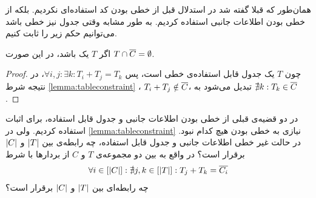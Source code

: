 همان‌طور که قبلا گفته شد در استدلال قبل از خطی بودن کد استفاده‌ای نکردیم. بلکه از خطی بودن اطلاعات جانبی استفاده کردیم. به طور مشابه وقتی جدول نیز خطی باشد می‌توانیم حکم زیر را ثابت کنیم.
\begin{theorem}
	اگر 
	$T$
	یک 
	باشد، در این صورت
	$T \cap \overline{C} = \emptyset$.
\end{theorem}
\begin{proof}
	چون
	$T$
	یک جدول قابل استفاده‌ی خطی است، پس
	$\forall i, j: \exists k: T_i + T_j = T_k$،
	در نتیجه شرط
	\autoref{lemma:tableconstraint}
	،
	$T_i + T_j \notin \overline{C}$،
	تبدیل می‌شود به
	$\nexists k: T_k \in \overline{C}$.
\end{proof}

\begin{openproblem}
	در دو قضیه‌ی قبلی از خطی بودن اطلاعات جانبی و جدول قابل استفاده، برای اثبات استفاده کردیم. ولی در
	\autoref{lemma:tableconstraint}
	نیازی به خطی بودن هیچ کدام نبود. در حالت غیر خطی اطلاعات جانبی و جدول قابل استفاده، چه رابطه‌ی بین
	$\left|{T}\right|$
	و
	$\left|{C}\right|$
	برقرار است؟ در واقع به بین دو مجموعه‌ی
	$T$
	و
	$C$
	 از بردارها با شرط
 	\begin{align}
	 	\forall i \in [\left|{C}\right|]: \nexists j, k \in [\left|{T}\right|]: T_j + T_k = \overline{C_i}
	 \end{align}
	 چه رابطه‌ای بین
	 	$\left|{T}\right|$
	 و
	 $\left|{C}\right|$
	 برقرار است؟
\end{openproblem}















